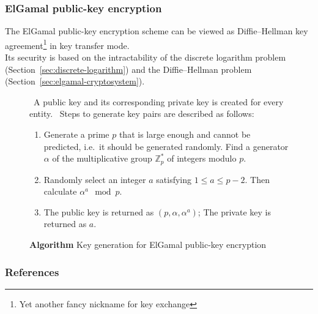 \documentclass[hyperref=true]{beamer}
\begin{document}
\begin{frame}
  \frametitle{ElGamal public-key encryption}
The ElGamal public-key encryption scheme can be viewed as
Diffie–Hellman key agreement\footnote{Yet another fancy nickname for
  key exchange} in key transfer mode.\\
Its security is based on the intractability of the discrete logarithm
problem (Section~\ref{sec:discrete-logarithm}) and the Diffie–Hellman 
problem (Section~\ref{sec:elgamal-cryptosystem}).
\end{frame}


\begin{frame}
  \begin{figure}
    \centering
  \begin{algorithmic}
    \ENSURE~A public key and its corresponding private key is created
    for every entity.
    \STATE~Steps to generate key pairs are described as follows:
    \begin{enumerate}
    \item Generate a prime $p$ that is large enough and cannot be
      predicted, i.e.\ it should be generated randomly. Find a
      generator $\alpha$ of the multiplicative group $\mathbb{Z}_{p}^{*}$ of
      integers modulo $p$.
    \item Randomly select an integer $a$ satisfying $1\leq
      a\leq p-2$. Then calculate $\alpha^{a}\mod p$.
    \item The public key is returned as $(p,\alpha,\alpha^{a})$; The
      private key is returned as $a$.
    \end{enumerate}
  \end{algorithmic}
  \caption{\textbf{Algorithm} Key generation for ElGamal public-key encryption}
  \label{fig:basic-elgamal-encryption}
  \end{figure}
\end{frame}





\begin{frame}[allowframebreaks]
  \frametitle{References}



\end{frame}
\end{document}
